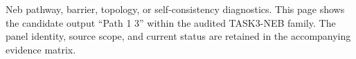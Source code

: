 Neb pathway, barrier, topology, or self-consistency diagnostics. This page shows the candidate output ``Path 1 3'' within the audited TASK3-NEB family. The panel identity, source scope, and current status are retained in the accompanying evidence matrix.
